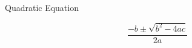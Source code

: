 \documentclass{article}
\begin{document}
Quadratic Equation

$$\frac{-b\pm\sqrt{b^2-4ac}}{2a}$$
\end{document}
